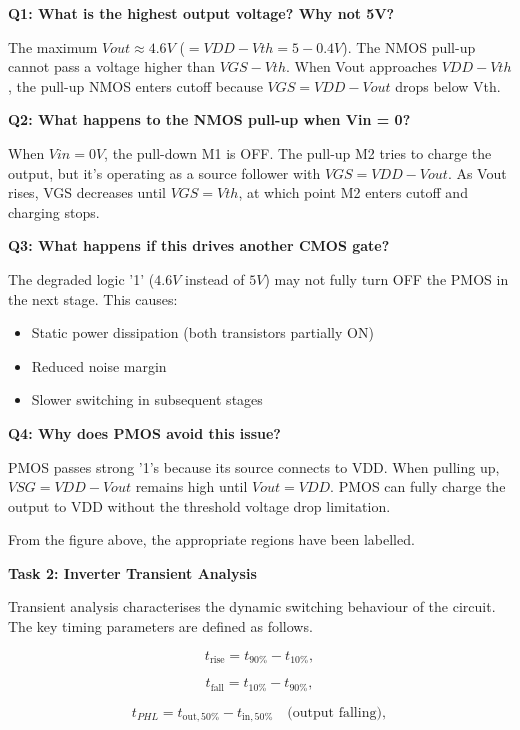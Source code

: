 \documentclass[a4paper,12pt]{article}
\begin{document}
\textbf{Q1: What is the highest output voltage? Why not 5V?}

The maximum $Vout \approx 4.6V$ ($= VDD - Vth = 5 - 0.4V$). The NMOS pull-up cannot pass a voltage higher than $VGS - Vth$. When Vout approaches $VDD - Vth$, the pull-up NMOS enters cutoff because $VGS = VDD - Vout$ drops below Vth.

\textbf{Q2: What happens to the NMOS pull-up when Vin = 0?}

When $Vin = 0V$, the pull-down M1 is OFF. The pull-up M2 tries to charge the output, but it's operating as a source follower with $VGS = VDD - Vout$. As Vout rises, VGS decreases until $VGS = Vth$, at which point M2 enters cutoff and charging stops.

\textbf{Q3: What happens if this drives another CMOS gate?}

The degraded logic '1' ($4.6V$ instead of $5V$) may not fully turn OFF the PMOS in the next stage. This causes:

\begin{itemize}
  \item Static power dissipation (both transistors partially ON)
  \item Reduced noise margin
  \item Slower switching in subsequent stages
\end{itemize}

\textbf{Q4: Why does PMOS avoid this issue?}

PMOS passes strong '1's because its source connects to VDD. When pulling up, $VSG = VDD - Vout$ remains high until $Vout = VDD$. PMOS can fully charge the output to VDD without the threshold voltage drop limitation.

From the figure above, the appropriate regions have been labelled.

\textbf{Task 2: Inverter Transient Analysis}

Transient analysis characterises the dynamic switching behaviour of the circuit. The key timing parameters are defined as follows.

\begin{equation}
t_{\text{rise}} = t_{90\%} - t_{10\%},
\end{equation}

\begin{equation}
t_{\text{fall}} = t_{10\%} - t_{90\%},
\end{equation}

\begin{equation}
t_{PHL} = t_{\text{out},50\%} - t_{\text{in},50\%} \quad \text{(output falling)},
\end{equation}
\end{document}
